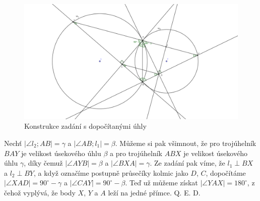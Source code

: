\documentclass{fkssolpub}
\author{Ondřej Sedláček}
\begin{document}
\begin{figure}[h!]
	\centering
	\includegraphics{6-fig.png}
	\caption{Konstrukce zadání s dopočítanými úhly}
\end{figure}

Nechť $|\angle l_2; AB| = \gamma$ a $|\angle AB; l_1| = \beta$. Můžeme si
pak všimnout, že pro trojúhelník $BAY$ je velikost úsekového úhlu $\beta$
a pro trojúhelník $ABX$ je velikost úsekového úhlu $\gamma$, díky čemuž
$|\angle AYB| = \beta$ a $|\angle BXA| = \gamma$. Ze zadání pak víme,
že $l_1 \perp BX$ a $l_2 \perp BY$, a když označíme postupně průsečíky
kolmic jako $D$, $C$, dopočítáme $|\angle XAD| = 90^{\circ} - \gamma$
a $|\angle CAY| = 90^{\circ} - \beta$. Teď už můžeme získat $|\angle YAX|
	= 180^{\circ}$, z čehož vyplývá, že body $X$, $Y$ a $A$ leží na jedné
přímce. Q. E. D.
\end{document}
